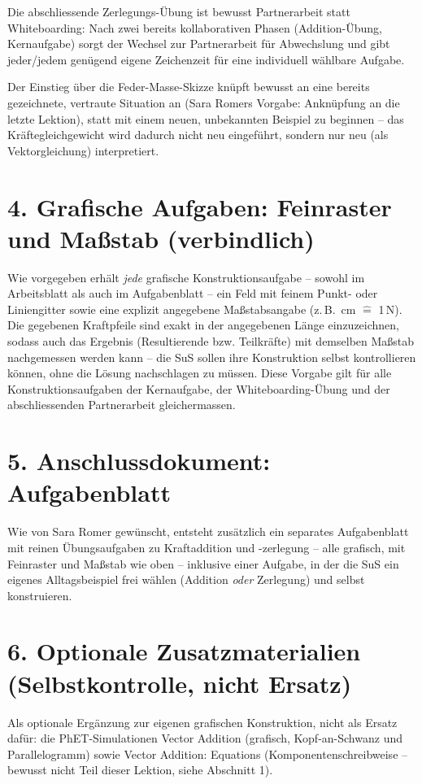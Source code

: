 \documentclass[11pt,a4paper]{article}
\begin{document}
Die abschliessende Zerlegungs-Übung ist bewusst Partnerarbeit statt
Whiteboarding: Nach zwei bereits kollaborativen Phasen (Addition-Übung,
Kernaufgabe) sorgt der Wechsel zur Partnerarbeit für Abwechslung und gibt
jeder/jedem genügend eigene Zeichenzeit für eine individuell wählbare
Aufgabe.

Der Einstieg über die Feder-Masse-Skizze knüpft bewusst an eine bereits
gezeichnete, vertraute Situation an (Sara Romers Vorgabe: Anknüpfung an
die letzte Lektion), statt mit einem neuen, unbekannten Beispiel zu
beginnen -- das Kräftegleichgewicht wird dadurch nicht neu eingeführt,
sondern nur neu (als Vektorgleichung) interpretiert.

\section*{4. Grafische Aufgaben: Feinraster und Maßstab (verbindlich)}

Wie vorgegeben erhält \emph{jede} grafische Konstruktionsaufgabe --
sowohl im Arbeitsblatt als auch im Aufgabenblatt -- ein Feld mit feinem
Punkt- oder Liniengitter sowie eine explizit angegebene Maßstabsangabe
(z.\,B. \,cm $\hat=$ 1\,N\grqq{}). Die gegebenen Kraftpfeile sind
exakt in der angegebenen Länge einzuzeichnen, sodass auch das Ergebnis
(Resultierende bzw. Teilkräfte) mit demselben Maßstab nachgemessen werden
kann -- die SuS sollen ihre Konstruktion selbst kontrollieren können,
ohne die Lösung nachschlagen zu müssen. Diese Vorgabe gilt für alle
Konstruktionsaufgaben der Kernaufgabe, der Whiteboarding-Übung und der
abschliessenden Partnerarbeit gleichermassen.

\section*{5. Anschlussdokument: Aufgabenblatt}

Wie von Sara Romer gewünscht, entsteht zusätzlich ein separates
Aufgabenblatt mit reinen Übungsaufgaben zu Kraftaddition und
-zerlegung -- alle grafisch, mit Feinraster und Maßstab wie oben --
inklusive einer Aufgabe, in der die SuS ein eigenes Alltagsbeispiel frei
wählen (Addition \emph{oder} Zerlegung) und selbst konstruieren.

\section*{6. Optionale Zusatzmaterialien (Selbstkontrolle, nicht Ersatz)}

Als optionale Ergänzung zur eigenen grafischen Konstruktion, nicht als
Ersatz dafür: die PhET-Simulationen \glqq Vector Addition\grqq{} (grafisch,
Kopf-an-Schwanz und Parallelogramm) sowie \glqq Vector Addition:
Equations\grqq{} (Komponentenschreibweise -- bewusst nicht Teil dieser
Lektion, siehe Abschnitt 1).
\end{document}
